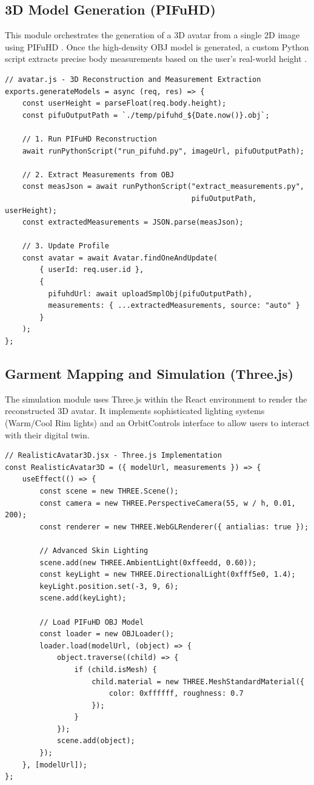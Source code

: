 \documentclass[12pt,a4paper,oneside]{report}
\begin{document}
\subsection{3D Model Generation (PIFuHD)}
This module orchestrates the generation of a 3D avatar from a single 2D image using PIFuHD \cite{1}. Once the high-density OBJ model is generated, a custom Python script extracts precise body measurements based on the user's real-world height \cite{8}.

\begin{verbatim}
// avatar.js - 3D Reconstruction and Measurement Extraction
exports.generateModels = async (req, res) => {
    const userHeight = parseFloat(req.body.height);
    const pifuOutputPath = `./temp/pifuhd_${Date.now()}.obj`;

    // 1. Run PIFuHD Reconstruction
    await runPythonScript("run_pifuhd.py", imageUrl, pifuOutputPath);

    // 2. Extract Measurements from OBJ
    const measJson = await runPythonScript("extract_measurements.py", 
                                           pifuOutputPath, userHeight);
    const extractedMeasurements = JSON.parse(measJson);

    // 3. Update Profile
    const avatar = await Avatar.findOneAndUpdate(
        { userId: req.user.id },
        { 
          pifuhdUrl: await uploadSmplObj(pifuOutputPath),
          measurements: { ...extractedMeasurements, source: "auto" }
        }
    );
};
\end{verbatim}

\subsection{Garment Mapping and Simulation (Three.js)}
The simulation module uses Three.js \cite{6} within the React environment to render the reconstructed 3D avatar. It implements sophisticated lighting systems (Warm/Cool Rim lights) and an OrbitControls interface to allow users to interact with their digital twin.

\begin{verbatim}
// RealisticAvatar3D.jsx - Three.js Implementation
const RealisticAvatar3D = ({ modelUrl, measurements }) => {
    useEffect(() => {
        const scene = new THREE.Scene();
        const camera = new THREE.PerspectiveCamera(55, w / h, 0.01, 200);
        const renderer = new THREE.WebGLRenderer({ antialias: true });
        
        // Advanced Skin Lighting
        scene.add(new THREE.AmbientLight(0xffeedd, 0.60));
        const keyLight = new THREE.DirectionalLight(0xfff5e0, 1.4);
        keyLight.position.set(-3, 9, 6);
        scene.add(keyLight);

        // Load PIFuHD OBJ Model
        const loader = new OBJLoader();
        loader.load(modelUrl, (object) => {
            object.traverse((child) => {
                if (child.isMesh) {
                    child.material = new THREE.MeshStandardMaterial({
                        color: 0xffffff, roughness: 0.7
                    });
                }
            });
            scene.add(object);
        });
    }, [modelUrl]);
};
\end{verbatim}
\end{document}
